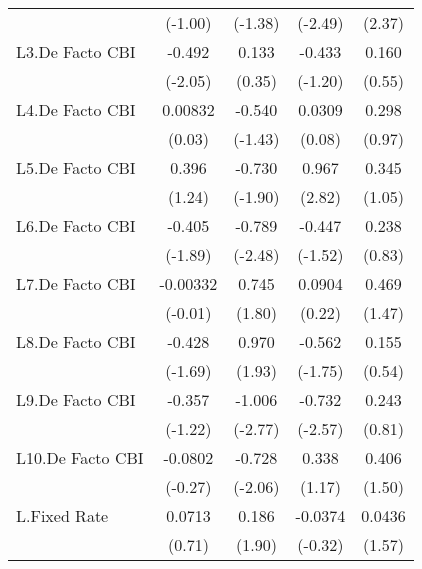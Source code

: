 {\begin{longtable}{l*{4}{c}}
                &  (-1.00)         &  (-1.38)         &  (-2.49)         &   (2.37)         \\
[1em]
L3.De Facto CBI &   -0.492\sym{*}  &    0.133         &   -0.433         &    0.160         \\
                &  (-2.05)         &   (0.35)         &  (-1.20)         &   (0.55)         \\
[1em]
L4.De Facto CBI &  0.00832         &   -0.540         &   0.0309         &    0.298         \\
                &   (0.03)         &  (-1.43)         &   (0.08)         &   (0.97)         \\
[1em]
L5.De Facto CBI &    0.396         &   -0.730         &    0.967\sym{**} &    0.345         \\
                &   (1.24)         &  (-1.90)         &   (2.82)         &   (1.05)         \\
[1em]
L6.De Facto CBI &   -0.405         &   -0.789\sym{*}  &   -0.447         &    0.238         \\
                &  (-1.89)         &  (-2.48)         &  (-1.52)         &   (0.83)         \\
[1em]
L7.De Facto CBI & -0.00332         &    0.745         &   0.0904         &    0.469         \\
                &  (-0.01)         &   (1.80)         &   (0.22)         &   (1.47)         \\
[1em]
L8.De Facto CBI &   -0.428         &    0.970         &   -0.562         &    0.155         \\
                &  (-1.69)         &   (1.93)         &  (-1.75)         &   (0.54)         \\
[1em]
L9.De Facto CBI &   -0.357         &   -1.006\sym{**} &   -0.732\sym{*}  &    0.243         \\
                &  (-1.22)         &  (-2.77)         &  (-2.57)         &   (0.81)         \\
[1em]
L10.De Facto CBI&  -0.0802         &   -0.728\sym{*}  &    0.338         &    0.406         \\
                &  (-0.27)         &  (-2.06)         &   (1.17)         &   (1.50)         \\
[1em]
L.Fixed Rate    &   0.0713         &    0.186         &  -0.0374         &   0.0436         \\
                &   (0.71)         &   (1.90)         &  (-0.32)         &   (1.57)         \\

\end{longtable}}
